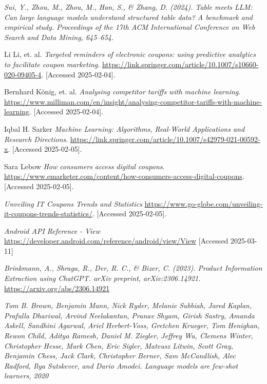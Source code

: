 \documentclass[licencjacka,en]{pracamgr}
\begin{document}
\begin{thebibliography}{99}
    \textit{Sui, Y., Zhou, M., Zhou, M., Han, S., \& Zhang, D. (2024). Table meets LLM: Can large language models understand structured table data? A benchmark and empirical study. Proceedings of the 17th ACM International Conference on Web Search and Data Mining, 645--654.}

    Li Li, et. al.
    \textit{Targeted reminders of electronic coupons: using predictive analytics to facilitate coupon marketing}.
    \url{https://link.springer.com/article/10.1007/s10660-020-09405-4}.
    [Accessed 2025-02-04].

    Bernhard König, et. al.
    \textit{Analysing competitor tariffs with machine learning}.
    \url{https://www.milliman.com/en/insight/analysing-competitor-tariffs-with-machine-learning}.
    [Accessed 2025-02-04].

    Iqbal H. Sarker
    \textit{Machine Learning: Algorithms, Real-World Applications and Research Directions}.
    \url{https://link.springer.com/article/10.1007/s42979-021-00592-x}.
    [Accessed 2025-02-05].

    Sara Lebow
    \textit{How consumers access digital coupons}.
    \url{https://www.emarketer.com/content/how-consumers-access-digital-coupons}.
    [Accessed 2025-02-05].

    \textit{Unveiling IT Coupons Trends and Statistics}
    \url{https://www.go-globe.com/unveiling-it-coupons-trends-statistics/}.
    [Accessed 2025-02-05].

    \textit{Android API Reference - View}
    \url{https://developer.android.com/reference/android/view/View}
    [Accessed 2025-03-11]

    \textit{Brinkmann, A., Shraga, R., Der, R. C., \& Bizer, C. (2023). Product Information Extraction using ChatGPT. arXiv preprint, arXiv:2306.14921.}
    \url{https://arxiv.org/abs/2306.14921}

    \textit{Tom B. Brown, Benjamin Mann, Nick Ryder, Melanie Subbiah, Jared
    Kaplan, Prafulla Dhariwal, Arvind Neelakantan, Pranav Shyam, Girish
    Sastry, Amanda Askell, Sandhini Agarwal, Ariel Herbert-Voss, Gretchen
    Krueger, Tom Henighan, Rewon Child, Aditya Ramesh, Daniel M.
    Ziegler, Jeffrey Wu, Clemens Winter, Christopher Hesse, Mark Chen,
    Eric Sigler, Mateusz Litwin, Scott Gray, Benjamin Chess, Jack Clark,
    Christopher Berner, Sam McCandlish, Alec Radford, Ilya Sutskever, and
    Dario Amodei. Language models are few-shot learners, 2020}


\end{thebibliography}
\end{document}
